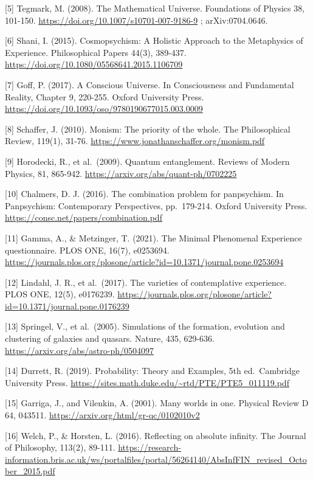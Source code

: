 \documentclass[
  10pt,
  a4paper,
]{article}
\begin{document}
{[}5{]} Tegmark, M. (2008). The Mathematical Universe. Foundations of
Physics 38, 101-150. \url{https://doi.org/10.1007/s10701-007-9186-9} ;
arXiv:0704.0646.

{[}6{]} Shani, I. (2015). Cosmopsychism: A Holistic Approach to the
Metaphysics of Experience. Philosophical Papers 44(3), 389-437.
\url{https://doi.org/10.1080/05568641.2015.1106709}

{[}7{]} Goff, P. (2017). A Conscious Universe. In Consciousness and
Fundamental Reality, Chapter 9, 220-255. Oxford University Press.
\url{https://doi.org/10.1093/oso/9780190677015.003.0009}

{[}8{]} Schaffer, J. (2010). Monism: The priority of the whole. The
Philosophical Review, 119(1), 31-76.
\url{https://www.jonathanschaffer.org/monism.pdf}

{[}9{]} Horodecki, R., et al.~(2009). Quantum entanglement. Reviews of
Modern Physics, 81, 865-942.
\url{https://arxiv.org/abs/quant-ph/0702225}

{[}10{]} Chalmers, D. J. (2016). The combination problem for
panpsychism. In Panpsychism: Contemporary Perspectives, pp.~179-214.
Oxford University Press. \url{https://consc.net/papers/combination.pdf}

{[}11{]} Gamma, A., \& Metzinger, T. (2021). The Minimal Phenomenal
Experience questionnaire. PLOS ONE, 16(7), e0253694.
\url{https://journals.plos.org/plosone/article?id=10.1371/journal.pone.0253694}

{[}12{]} Lindahl, J. R., et al.~(2017). The varieties of contemplative
experience. PLOS ONE, 12(5), e0176239.
\url{https://journals.plos.org/plosone/article?id=10.1371/journal.pone.0176239}

{[}13{]} Springel, V., et al.~(2005). Simulations of the formation,
evolution and clustering of galaxies and quasars. Nature, 435, 629-636.
\url{https://arxiv.org/abs/astro-ph/0504097}

{[}14{]} Durrett, R. (2019). Probability: Theory and Examples, 5th
ed.~Cambridge University Press.
\url{https://sites.math.duke.edu/~rtd/PTE/PTE5_011119.pdf}

{[}15{]} Garriga, J., and Vilenkin, A. (2001). Many worlds in one.
Physical Review D 64, 043511.
\url{https://arxiv.org/html/gr-qc/0102010v2}

{[}16{]} Welch, P., \& Horsten, L. (2016). Reflecting on absolute
infinity. The Journal of Philosophy, 113(2), 89-111.
\url{https://research-information.bris.ac.uk/ws/portalfiles/portal/56264140/AbsInfFIN_revised_October_2015.pdf}
\end{document}
